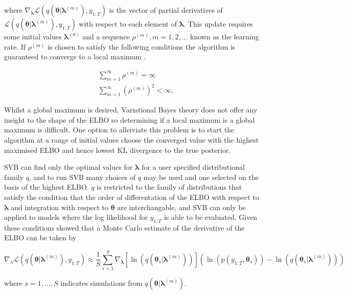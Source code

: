 \documentclass[12pt,a4paper]{article}%
\numberwithin{equation}{section}
\begin{document}
where $\nabla_{\boldsymbol{\lambda}}\mathcal{L}(q(\boldsymbol{\theta} | \boldsymbol{\lambda}^{(m)}), y_{1:T})$ is the vector of partial derivatives of $\mathcal{L}(q(\boldsymbol{\theta} | \boldsymbol{\lambda}^{(m)}), y_{1:T})$ with respect to each element of $\boldsymbol{\lambda}$. This update requires some initial values $\boldsymbol{\lambda}^{(0)}$ and a sequence $\rho^{(m)}, m = 1, 2, \dots$ known as the learning rate. If $\rho^{(m)}$ is chosen to satisfy the following conditions the algorithm is guaranteed to converge to a local maximum \citep{Robbins1951}.

\begin{align}
&\sum_{m=1}^{\infty} \rho^{(m)} =  \infty \\
&\sum_{m=1}^{\infty} (\rho^{(m)})^2 <  \infty.
\end{align}

Whilst a global maximum is desired, Variational Bayes theory does not offer any insight to the shape of the ELBO so determining if a local maximum is a global maximum is difficult. One option to alleiviate this problem is to start the algorithm at a range of initial values choose the converged value with the highest maximised ELBO and hence lowest KL divergence to the true posterior. 

SVB can find only the optimal values for $\boldsymbol{\lambda}$ for a user specified distributional family $q$, and to run SVB many choices of $q$ may be used and one selected on the basis of the highest ELBO. $q$ is restricted to the family of distributions that satisfy the condition that the order of differentation of the ELBO with respect to $\boldsymbol{\lambda}$ and integration with respect to $\boldsymbol{\theta}$ are interchangable, and SVB can only be applied to models where the log likelihood for $y_{1:T}$ is able to be evaluated. Given these conditions \citet{Ranganath2014} showed that a Monte Carlo estimate of the derivative of the ELBO can be taken by

\begin{equation}
\label{SGA2}
\nabla_{\lambda}\mathcal{L}(q(\boldsymbol{\theta} | \boldsymbol{\lambda}^{(m)}), y_{1:T}) \approx \frac{1}{S}\sum_{s=1}^{S} \nabla_{\boldsymbol{\lambda}} [\ln(q(\boldsymbol{\theta}_s | \boldsymbol{\lambda}^{(m)}))] (\ln (p(y_{1:T}, \boldsymbol{\theta}_s)) - \ln(q(\boldsymbol{\theta}_s | \boldsymbol{\lambda}^{(m)})))
\end{equation}

where $s = 1, \dots, S$ indicates simulations from $q(\boldsymbol{\theta} | \boldsymbol{\lambda}^{(m)})$.
\end{document}
